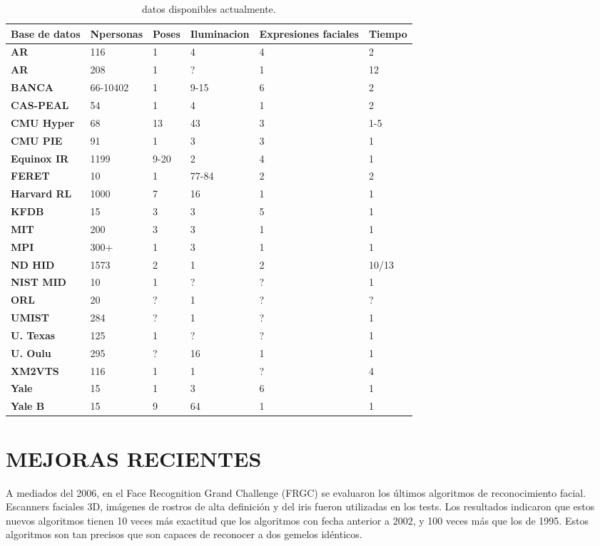 \documentclass[a4paper,11pt]{article}
\begin{document}
 \begin{table}[htbp] 	
 	\begin{tabular}{|p{2cm}||p{2cm}||p{2cm}||p{2cm}||p{2cm}||p{2cm}|}
 	  \hline
 		\textbf{Base de datos} & Npersonas & Poses & Iluminacion & Expresiones faciales & Tiempo \\
 		\hline \hline
 		\textbf{AR} &116&1&4&4&2   \\ \hline
 			\textbf{AR} &208&1&?&1&12   \\ \hline
 			\textbf{BANCA} &66-10402&1&9-15&6&2   \\ \hline
 			\textbf{CAS-PEAL} &54&1&4&1&2   \\ \hline
 			\textbf{CMU Hyper} &68&13&43&3&1-5   \\ \hline
 			\textbf{CMU PIE} &91&1&3&3&1   \\ \hline
 			\textbf{Equinox IR} &1199&9-20&2&4&1   \\ \hline
 			\textbf{FERET} &10&1&77-84&2&2   \\ \hline
 			\textbf{Harvard RL} &1000&7&16&1&1   \\ \hline
 			\textbf{KFDB} &15&3&3&5&1   \\ \hline
 			\textbf{MIT} &200&3&3&1&1   \\ \hline
 			\textbf{MPI} &300+&1&3&1&1   \\ \hline
 			\textbf{ND HID} &1573&2&1&2&10/13   \\ \hline
 			\textbf{NIST MID} &10&1&?&?&1   \\ \hline
 			\textbf{ORL} &20&?&1&?&?   \\ \hline
 			\textbf{UMIST} &284&?&1&?&1   \\ \hline
 			\textbf{U. Texas} &125&1&?&?&1   \\ \hline
 			\textbf{U. Oulu} &295&?&16&1&1   \\ \hline
 			\textbf{XM2VTS} &116&1&1&?&4   \\ \hline
 			\textbf{Yale} &15&1&3&6&1   \\ \hline
 			\textbf{Yale B} &15&9&64&1&1   \\ \hline
 	 
 	\end{tabular}
 	\caption{datos disponibles actualmente. }
 	\label{tabladatos disponibles actualmente.}
 \end{table}
 
  \section{MEJORAS RECIENTES}
  A mediados del 2006, en el Face Recognition Grand Challenge (FRGC) se evaluaron los últimos algoritmos de reconocimiento facial. Escanners faciales 3D, imágenes de rostros de alta definición y del iris fueron utilizadas en los tests. Los resultados indicaron que estos nuevos algoritmos tienen 10 veces más exactitud que los algoritmos con fecha anterior a 2002, y 100 veces más que los de 1995. Estos algoritmos son tan precisos que son capaces de reconocer a dos gemelos idénticos.
  
\end{document}
